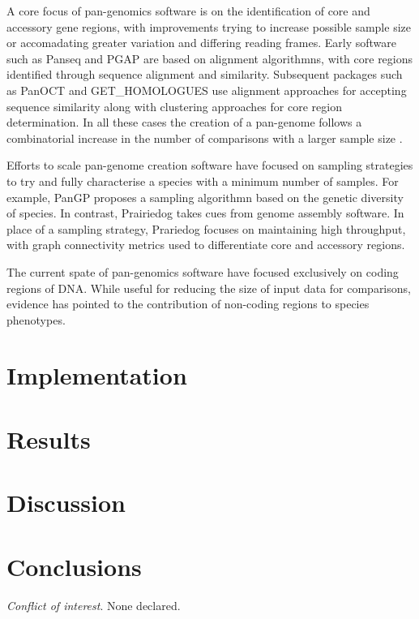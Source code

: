 \documentclass{article}
\begin{document}
A core focus of pan-genomics software is on the identification of core and accessory gene regions, with improvements trying to increase possible sample size or accomadating greater variation and differing reading frames.
Early software such as Panseq \cite{laing2010pan} and PGAP \cite{zhao2011pgap} are based on alignment algorithmns, with core regions identified through sequence alignment and similarity.
Subsequent packages such as PanOCT \cite{fouts2012panoct} and GET_HOMOLOGUES \cite{contreras2013get_homologues} use alignment approaches for accepting sequence similarity along with clustering approaches for core region determination.
In all these cases the creation of a pan-genome follows a combinatorial increase in the number of comparisons with a larger sample size \cite{vernikos2015ten}.

Efforts to scale pan-genome creation software have focused on sampling strategies to try and fully characterise a species with a minimum number of samples.
For example, PanGP \cite{zhao2014pangp} proposes a sampling algorithmn based on the genetic diversity of species.
In contrast, Prairiedog takes cues from genome assembly software.
In place of a sampling strategy, Prariedog focuses on maintaining high throughput, with graph connectivity metrics used to differentiate core and accessory regions.


The current spate of pan-genomics software have focused exclusively on coding regions of DNA.
While useful for reducing the size of input data for comparisons, evidence \cite{} has pointed to the contribution of non-coding regions to species phenotypes.


\section{Implementation}

\section{Results}

\section{Discussion}


\section{Conclusions}


\textit{Conflict of interest}. None declared.

\newpage



\end{document}
